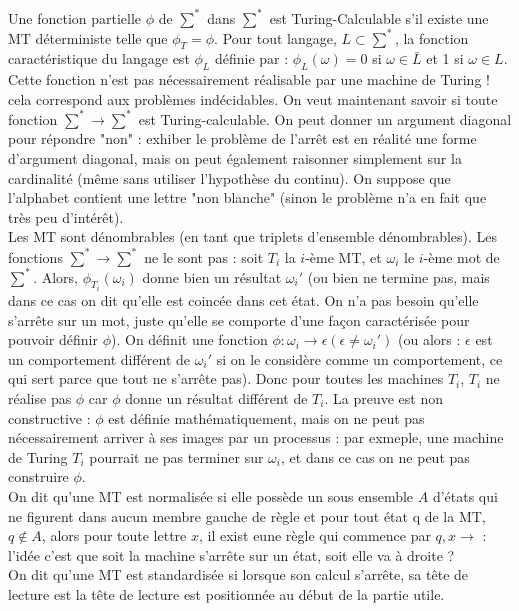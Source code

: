 \documentclass{article}
\begin{document}
Une fonction partielle $\phi$ de $\sum^*$ dans $\sum^*$ est Turing-Calculable s'il existe une MT déterministe telle que $\phi_T = \phi$.  Pour tout langage, $L \subset \sum^*$, la fonction caractéristique du langage est $\phi_L$ définie par : $\phi_L(\omega) = $0 si $\omega \in \bar{L}$ et 1 si $\omega \in L$. Cette fonction n'est pas nécessairement réalisable par une machine de Turing ! cela correspond aux problèmes indécidables. On veut maintenant savoir si toute fonction $\sum^* \rightarrow \sum^*$ est Turing-calculable. On peut donner un argument diagonal pour répondre "non" : exhiber le problème de l'arrêt est en réalité une forme d'argument diagonal, mais on peut également raisonner simplement sur la cardinalité (même sans utiliser l'hypothèse du continu). On suppose que l'alphabet contient une lettre "non blanche" (sinon le problème n'a en fait que très peu d'intérêt).\\  
Les MT sont dénombrables (en tant que triplets d'ensemble dénombrables). Les fonctions $\sum^* \rightarrow \sum^*$ ne le sont pas : soit $T_i$ la $i$-ème MT, et $\omega_i$ le $i$-ème mot de $\sum^*$. Alors, $\phi_{T_i}(\omega_i)$ donne bien un résultat $\omega_i'$ (ou bien ne termine pas, mais dans ce cas on dit qu'elle est coincée dans cet état. On n'a pas besoin qu'elle s'arrête sur un mot, juste qu'elle se comporte d'une façon caractérisée pour pouvoir définir $\phi$). On définit une fonction $\phi : \omega_i \rightarrow \epsilon (\epsilon \neq \omega_i')$ (ou alors : $\epsilon$ est un comportement différent de $\omega_i'$ si on le considère comme un comportement, ce qui sert parce que tout ne s'arrête pas). Donc pour toutes les machines $T_i$, $T_i$ ne réalise pas $\phi$ car $\phi$ donne un résultat différent de $T_i$. La preuve est non constructive : $\phi$ est définie mathématiquement, mais on ne peut pas nécessairement arriver à ses images par un processus : par exmeple, une machine de Turing $T_i$ pourrait ne pas terminer sur $\omega_i$, et dans ce cas on ne peut pas construire $\phi$. \\ 
On dit qu'une MT est normalisée si elle possède un sous ensemble $A$ d'états qui ne figurent dans aucun membre gauche de règle et pour tout état q de la MT, $q \notin A$, alors pour toute lettre $x$, il exist eune règle qui commence par $q,x \rightarrow$ : l'idée c'est que soit la machine s'arrête sur un état, soit elle va à droite ? \\ 
On dit qu'une MT est standardisée si lorsque son calcul s'arrête, sa tête de lecture est la tête de lecture est positionnée au début de la partie utile. \\ 
\end{document}
